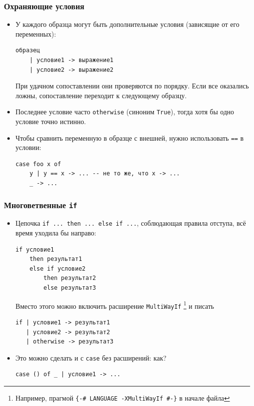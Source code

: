 \documentclass[10pt]{beamer}
\begin{document}
\begin{frame}[fragile]
\frametitle{Охраняющие условия}
\begin{itemize}
    \item У каждого образца могут быть дополнительные условия (зависящие от его переменных): 
\begin{lstlisting}[basicstyle=\ttfamily]
образец
    | условие1 -> выражение1 
    | условие2 -> выражение2
\end{lstlisting}
При удачном сопоставлении они проверяются по порядку. Если все оказались ложны, сопоставление переходит к следующему образцу.
\item Последнее условие часто \lstinline|otherwise| (синоним \lstinline|True|), тогда хотя бы одно условие точно истинно.
\item Чтобы сравнить переменную в образце с внешней, нужно использовать \lstinline|==| в условии:
\begin{lstlisting}[basicstyle=\ttfamily]
case foo x of
    y | y == x -> ... -- не то же, что x -> ...
    _ -> ...
\end{lstlisting}
\end{itemize}
\end{frame}

\begin{frame}[fragile]
\frametitle{Многоветвенные \lstinline[basicstyle=\ttfamily]|if|}
\begin{itemize}
    \item Цепочка \lstinline|if ... then ... else if ...|, соблюдающая правила отступа, всё время уходила бы направо:
\begin{lstlisting}[basicstyle=\ttfamily\small]
if условие1
    then результат1
    else if условие2
        then результат2
        else результат3
\end{lstlisting}
    Вместо этого можно включить расширение \lstinline|MultiWayIf| \cprotect\footnote{Например, прагмой \lstinline|{-# LANGUAGE -XMultiWayIf #-}| в начале файла} и писать
\begin{lstlisting}[basicstyle=\ttfamily\small]
if | условие1 -> результат1
   | условие2 -> результат2
   | otherwise -> результат3
\end{lstlisting}
\item Это можно сделать и с \lstinline|case| без расширений: как? \pause \begin{lstlisting}[basicstyle=\ttfamily\small]
case () of _ | условие1 -> ...
\end{lstlisting}
\end{itemize}
\end{frame}
\end{document}
